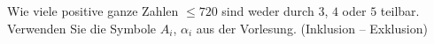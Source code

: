 \begin{aufgabe}
Wie viele positive ganze Zahlen $\leq 720$ sind weder durch $3$, $4$ oder $5$ teilbar. Verwenden Sie die Symbole $A_i$, $\alpha_i$ aus der Vorlesung. (Inklusion -- Exklusion)
\end{aufgabe}
